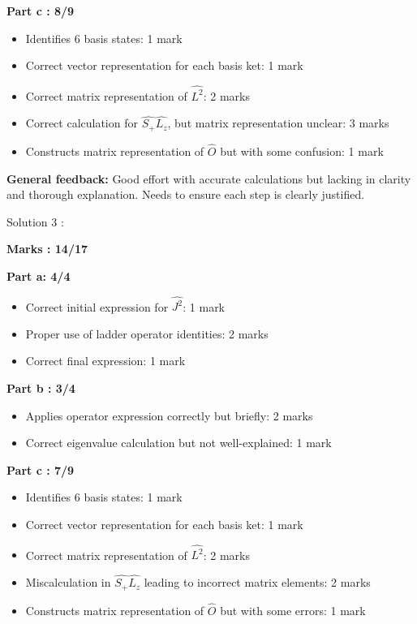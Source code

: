 \documentclass[a4paper,11pt]{article}
\begin{document}
\textbf{Part c : 8/9}
\begin{itemize}
    \item Identifies 6 basis states: 1 mark
    \item Correct vector representation for each basis ket: 1 mark
    \item Correct matrix representation of $\hat{L^2}$: 2 marks
    \item Correct calculation for $\hat{S_+}\hat{L_z}$, but matrix representation unclear: 3 marks
    \item Constructs matrix representation of $\hat{O}$ but with some confusion: 1 mark
\end{itemize}

\textbf{General feedback:}
Good effort with accurate calculations but lacking in clarity and thorough explanation. Needs to ensure each step is clearly justified.


Solution 3 :

\textbf{Marks : 14/17}

\textbf{Part a: 4/4}
\begin{itemize}
    \item Correct initial expression for $\hat{J^2}$: 1 mark
    \item Proper use of ladder operator identities: 2 marks
    \item Correct final expression: 1 mark
\end{itemize}

\textbf{Part b : 3/4}
\begin{itemize}
    \item Applies operator expression correctly but briefly: 2 marks
    \item Correct eigenvalue calculation but not well-explained: 1 mark
\end{itemize}

\textbf{Part c : 7/9}
\begin{itemize}
    \item Identifies 6 basis states: 1 mark
    \item Correct vector representation for each basis ket: 1 mark
    \item Correct matrix representation of $\hat{L^2}$: 2 marks
    \item Miscalculation in $\hat{S_+}\hat{L_z}$ leading to incorrect matrix elements: 2 marks
    \item Constructs matrix representation of $\hat{O}$ but with some errors: 1 mark
\end{itemize}
\end{document}
